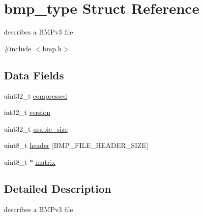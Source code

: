 \hypertarget{structbmp__type}{\section{bmp\-\_\-type \-Struct \-Reference}
\label{structbmp__type}
}


describes a \-B\-M\-Pv3 file  




{\ttfamily \#include $<$bmp.\-h$>$}

\subsection*{\-Data \-Fields}
\begin{DoxyCompactItemize}
\item 
uint32\-\_\-t \hyperlink{structbmp__type_ab001ea0e77561ed8d03a29079550a720}{compressed}
\item 
int32\-\_\-t \hyperlink{structbmp__type_a67fae7dd1de9edce3656ed214d20377f}{version}
\item 
uint32\-\_\-t \hyperlink{structbmp__type_aadfd1cc69862b81f6c5a3722504fda3c}{usable\-\_\-size}
\item 
uint8\-\_\-t \hyperlink{structbmp__type_a503e04ba6bcc7286467e069ddebd5332}{header} \mbox{[}\-B\-M\-P\-\_\-\-F\-I\-L\-E\-\_\-\-H\-E\-A\-D\-E\-R\-\_\-\-S\-I\-Z\-E\mbox{]}
\item 
uint8\-\_\-t $\ast$ \hyperlink{structbmp__type_a16aac5379a86abf69c6ac771af178866}{matrix}
\end{DoxyCompactItemize}


\subsection{\-Detailed \-Description}
describes a \-B\-M\-Pv3 file 

